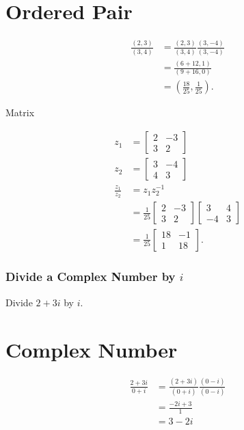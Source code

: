 \section{Ordered Pair}
$$
\begin{aligned}
\frac{(2,3)}{(3,4)} & =\frac{(2,3)}{(3,4)} \frac{(3,-4)}{(3,-4)} \\
& =\frac{(6+12,1)}{(9+16,0)} \\
& =\left(\frac{18}{25}, \frac{1}{25}\right) .
\end{aligned}
$$

Matrix

$$
\begin{aligned}
z_{1} & =\left[\begin{array}{cc}
2 & -3 \\
3 & 2
\end{array}\right] \\
z_{2} & =\left[\begin{array}{cc}
3 & -4 \\
4 & 3
\end{array}\right] \\
\frac{z_{1}}{z_{2}} & =z_{1} z_{2}^{-1} \\
& =\frac{1}{25}\left[\begin{array}{cc}
2 & -3 \\
3 & 2
\end{array}\right]\left[\begin{array}{cc}
3 & 4 \\
-4 & 3
\end{array}\right] \\
& =\frac{1}{25}\left[\begin{array}{cc}
18 & -1 \\
1 & 18
\end{array}\right] .
\end{aligned}
$$

\subsubsection{Divide a Complex Number by $i$}
Divide $2+3 i$ by $i$.

\section{Complex Number}
$$
\begin{aligned}
\frac{2+3 i}{0+i} & =\frac{(2+3 i)}{(0+i)} \frac{(0-i)}{(0-i)} \\
& =\frac{-2 i+3}{1} \\
& =3-2 i
\end{aligned}
$$

